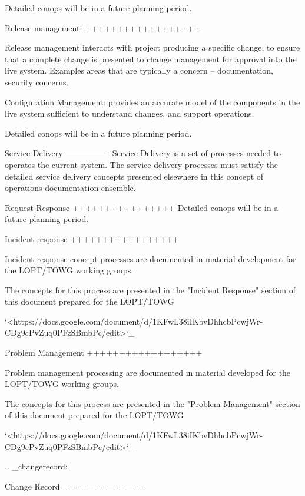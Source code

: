{{{{{{{Detailed conops will be in a future planning period.


Release management:
++++++++++++++++++

Release management interacts with project producing a specific change, to ensure that
a complete change is presented to change management for approval into the live system.
Examples areas that are typically a concern -- documentation, security concerns.

Configuration Management: provides an accurate model of the components in the live
system sufficient to understand changes, and support operations.

Detailed conops will be in a future planning period.

Service Delivery
----------------
Service Delivery is a set of processes needed to operates the current system.  The service delivery
processes must satisfy the detailed service delivery concepts presented elsewhere in this concept of
operations documentation ensemble. 

Request Response
++++++++++++++++
Detailed conops will be in a future planning period.

Incident response
+++++++++++++++++

Incident response concept processes are documented in material development for the
LOPT/TOWG working groups. 

The concepts for this process are presented in the "Incident Response" section of this document prepared for the LOPT/TOWG

`<https://docs.google.com/document/d/1KFwL38iIKbvDhhcbPcwjWr-CDg9cPvZuq0PFzSBmbPc/edit>`_

Problem Management
++++++++++++++++++

Problem management processing are documented in material developed for the LOPT/TOWG working groups.

The concepts for this process are presented in the "Problem Management" section of this document prepared for the LOPT/TOWG

`<https://docs.google.com/document/d/1KFwL38iIKbvDhhcbPcwjWr-CDg9cPvZuq0PFzSBmbPc/edit>`_

.. _changerecord:

Change Record
=============


}}}}}}}
